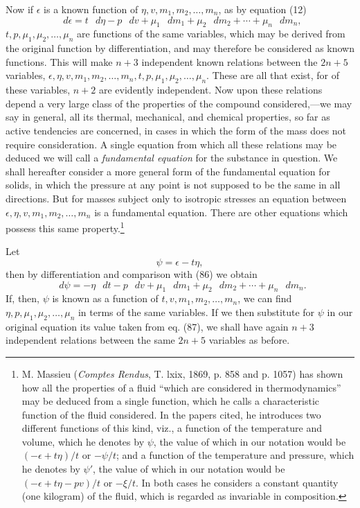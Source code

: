 \documentclass[11pt]{article}
\newcommand{\dd}{\mathop{}\!d}
\newcommand{\eps}{\epsilon}
\begin{document}
Now if \(\eps\) is a known function of \(\eta,v,m_1,m_2,\ldots,m_n\), as by equation (12)
\begin{equation}
\dd\eps=t\,\dd\eta-p\,\dd v+\mu_1\,\dd m_1+\mu_2\,\dd m_2+\cdots+\mu_n\,\dd m_n,
\end{equation}
\(t,p,\mu_1,\mu_2,\ldots,\mu_n\) are functions of the same variables, which may be derived from the original function by differentiation, and may therefore be considered as known functions. This will make \(n+3\) independent known relations between the \(2n+5\) variables, \(\eps,\eta,v,m_1,m_2,\ldots,m_n,t,p,\mu_1,\mu_2,\ldots,\mu_n\). These are all that exist, for of these variables, \(n+2\) are evidently independent. Now upon these relations depend a very large class of the properties of the compound considered,---we may say in general, all its thermal, mechanical, and chemical properties, so far as active tendencies are concerned, in cases in which the form of the mass does not require consideration. A single equation from which all these relations may be deduced we will call a \textit{fundamental equation} for the substance in question. We shall hereafter consider a more general form of the fundamental equation for solids, in which the pressure at any point is not supposed to be the same in all directions. But for masses subject only to isotropic stresses an equation between \(\eps,\eta,v,m_1,m_2,\ldots,m_n\) is a fundamental equation. There are other equations which possess this same property.\footnote{M. Massieu (\textit{Comptes Rendus}, T. lxix, 1869, p. 858 and p. 1057) has shown how all the properties of a fluid ``which are considered in thermodynamics'' may be deduced from a single function, which he calls a characteristic function of the fluid considered. In the papers cited, he introduces two different functions of this kind, viz., a function of the temperature and volume, which he denotes by \(\psi\), the value of which in our notation would be \((-\eps+t\eta)/t\) or \(-\psi/t\); and a function of the temperature and pressure, which he denotes by \(\psi'\), the value of which in our notation would be \((-\eps+t\eta-pv)/t\) or \(-\xi/t\). In both cases he considers a constant quantity (one kilogram) of the fluid, which is regarded as invariable in composition.}

Let
\begin{equation}
\psi=\eps-t\eta,
\end{equation}
then by differentiation and comparison with (86) we obtain
\begin{equation}
\dd\psi=-\eta\,\dd t-p\,\dd v+\mu_1\,\dd m_1+\mu_2\,\dd m_2+\cdots+\mu_n\,\dd m_n.
\end{equation}
If, then, \(\psi\) is known as a function of \(t,v,m_1,m_2,\ldots,m_n\), we can find \(\eta,p,\mu_1,\mu_2,\ldots,\mu_n\) in terms of the same variables. If we then substitute for \(\psi\) in our original equation its value taken from eq. (87), we shall have again \(n+3\) independent relations between the same \(2n+5\) variables as before.
\end{document}
